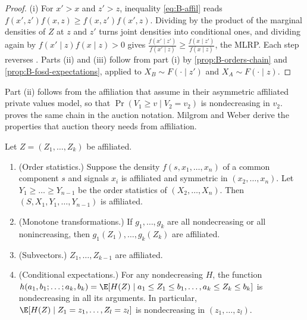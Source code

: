 \begin{proof}
(i) For $x' > x$ and $z' > z$, inequality \eqref{eq:B-affil} reads $f(x', z')f(x, z) \geq f(x, z')f(x', z)$. Dividing by the
product of the marginal densities of $Z$ at $z$ and $z'$ turns joint densities into conditional ones, and dividing
again by $f(x' \mid z)f(x \mid z) > 0$ gives
$\frac{f(x' \mid z')}{f(x' \mid z)} \geq \frac{f(x \mid z')}{f(x \mid z)}$, the MLRP. Each step reverses
\citep[footnote 16]{MilgromWeber1982}. Parts (ii) and (iii) follow from part (i) by \cref{prop:B-orders-chain} and
\cref{prop:B-fosd-expectations}, applied to $X_B \sim F(\cdot \mid z')$ and $X_A \sim F(\cdot \mid z)$.
\end{proof}

Part (ii) follows from the affiliation that \citet{CampoPerrigneVuong2003} assume in their asymmetric affiliated
private values model, so that $\Pr(V_1 \geq v \mid V_2 = v_2)$ is nondecreasing in $v_2$. 
proves the same chain in the auction notation. Milgrom and Weber derive the properties that auction theory needs
from affiliation.

\begin{proposition}\label{prop:B-affil-properties}
Let $Z = (Z_1, \dots, Z_k)$ be affiliated.
\begin{enumerate}[label=(\roman*)]
  \item (Order statistics.) Suppose the density $f(s, x_1, \dots, x_n)$ of a common component $s$ and signals $x_i$ is
  affiliated and symmetric in $(x_2, \dots, x_n)$. Let $Y_1 \geq \dots \geq Y_{n-1}$ be the order statistics of
  $(X_2, \dots, X_n)$. Then $(S, X_1, Y_1, \dots, Y_{n-1})$ is affiliated.
  \item (Monotone transformations.) If $g_1, \dots, g_k$ are all nondecreasing or all nonincreasing, then
  $g_1(Z_1), \dots, g_k(Z_k)$ are affiliated.
  \item (Subvectors.) $Z_1, \dots, Z_{k-1}$ are affiliated.
  \item (Conditional expectations.) For any nondecreasing $H$, the function
  $h(a_1, b_1; \dots; a_k, b_k) = \E[H(Z) \mid a_1 \leq Z_1 \leq b_1, \dots, a_k \leq Z_k \leq b_k]$ is nondecreasing in all its arguments.
  In particular, $\E[H(Z) \mid Z_1 = z_1, \dots, Z_l = z_l]$ is nondecreasing in $(z_1, \dots, z_l)$.
\end{enumerate}
\end{proposition}

